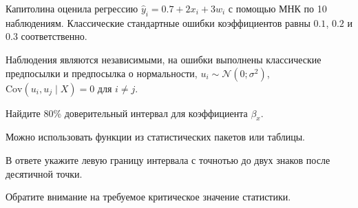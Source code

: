 
\begin{question}
Капитолина оценила регрессию \(\hat y_i = 0.7 + 2x_i + 3w_i\) с помощью МНК по 10 наблюдениям.
Классические стандартные ошибки коэффициентов равны \(0.1\), \(0.2\) и \(0.3\) соответственно.

Наблюдения являются независимыми,
на ошибки выполнены классические предпосылки и предпосылка о нормальности, \(u_i\sim \mathcal N(0;\sigma^2)\), \(\mathrm{Cov}(u_i, u_j \mid X) = 0\) для \(i\neq j\).

Найдите 80\% доверительный интервал для коэффициента \(\beta_x\).

Можно использовать функции из статистических пакетов или таблицы.

В ответе укажите левую границу интервала с точнотью до двух знаков после десятичной точки.
\end{question}

\begin{solution}
Обратите внимание на требуемое критическое значение статистики.
\end{solution}

